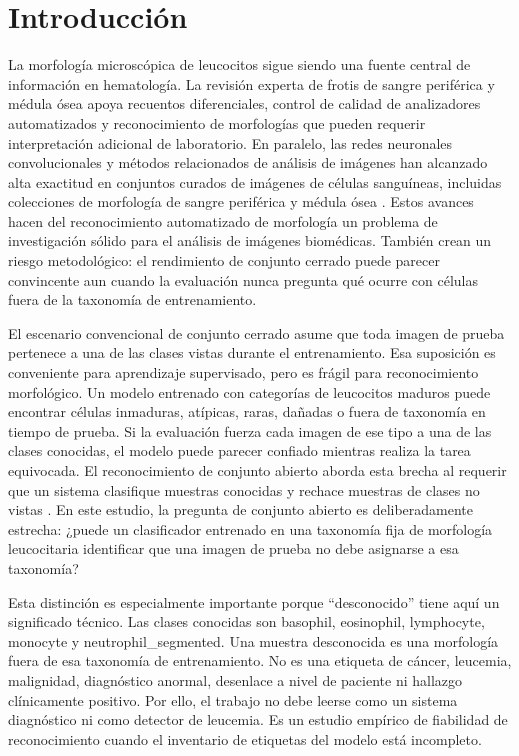 \documentclass[11pt]{article}
\begin{document}
\section{Introducción}

La morfología microscópica de leucocitos sigue siendo una fuente central de información en hematología. La revisión experta de frotis de sangre periférica y médula ósea apoya recuentos diferenciales, control de calidad de analizadores automatizados y reconocimiento de morfologías que pueden requerir interpretación adicional de laboratorio. En paralelo, las redes neuronales convolucionales y métodos relacionados de análisis de imágenes han alcanzado alta exactitud en conjuntos curados de imágenes de células sanguíneas, incluidas colecciones de morfología de sangre periférica y médula ósea \cite{walter2023_ai_hematology,khan2021_wbc_review,deshpande2021_blood_cells_review,acevedo2019_peripheral_blood_cnn,matek2019_blast,matek2021_bone_marrow}. Estos avances hacen del reconocimiento automatizado de morfología un problema de investigación sólido para el análisis de imágenes biomédicas. También crean un riesgo metodológico: el rendimiento de conjunto cerrado puede parecer convincente aun cuando la evaluación nunca pregunta qué ocurre con células fuera de la taxonomía de entrenamiento.

El escenario convencional de conjunto cerrado asume que toda imagen de prueba pertenece a una de las clases vistas durante el entrenamiento. Esa suposición es conveniente para aprendizaje supervisado, pero es frágil para reconocimiento morfológico. Un modelo entrenado con categorías de leucocitos maduros puede encontrar células inmaduras, atípicas, raras, dañadas o fuera de taxonomía en tiempo de prueba. Si la evaluación fuerza cada imagen de ese tipo a una de las clases conocidas, el modelo puede parecer confiado mientras realiza la tarea equivocada. El reconocimiento de conjunto abierto aborda esta brecha al requerir que un sistema clasifique muestras conocidas y rechace muestras de clases no vistas \cite{scheirer2013_open_set,geng2021_osr_survey,bendale2016_openmax,yang2024_generalized_ood}. En este estudio, la pregunta de conjunto abierto es deliberadamente estrecha: ¿puede un clasificador entrenado en una taxonomía fija de morfología leucocitaria identificar que una imagen de prueba no debe asignarse a esa taxonomía?

Esta distinción es especialmente importante porque ``desconocido'' tiene aquí un significado técnico. Las clases conocidas son basophil, eosinophil, lymphocyte, monocyte y neutrophil\_segmented. Una muestra desconocida es una morfología fuera de esa taxonomía de entrenamiento. No es una etiqueta de cáncer, leucemia, malignidad, diagnóstico anormal, desenlace a nivel de paciente ni hallazgo clínicamente positivo. Por ello, el trabajo no debe leerse como un sistema diagnóstico ni como detector de leucemia. Es un estudio empírico de fiabilidad de reconocimiento cuando el inventario de etiquetas del modelo está incompleto.
\end{document}
